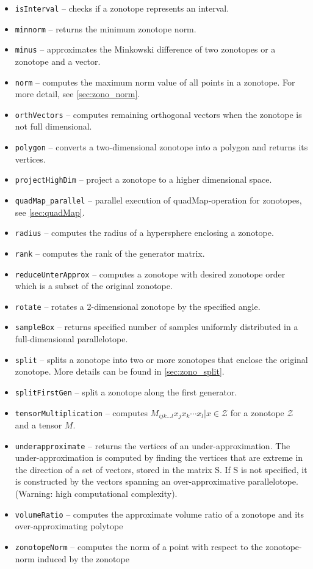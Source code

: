 \begin{itemize}
    \item \texttt{isInterval} -- checks if a zonotope represents an interval.
    \item \texttt{minnorm} -- returns the minimum zonotope norm.
    \item \texttt{minus} -- approximates the Minkowski difference of two zonotopes or a zonotope and a vector.
    \item \texttt{norm} -- computes the maximum norm value of all points in a zonotope. For more detail, see \cref{sec:zono_norm}.
    \item \texttt{orthVectors} -- computes remaining orthogonal vectors when the zonotope is not full dimensional.
    \item \texttt{polygon} -- converts a two-dimensional zonotope into a polygon and returns its vertices.
    \item \texttt{projectHighDim} -- project a zonotope to a higher dimensional space.
    \item \texttt{quadMap\_parallel} -- parallel execution of quadMap-operation for zonotopes, see \cref{sec:quadMap}.
    \item \texttt{radius} -- computes the radius of a hypersphere enclosing a zonotope.
    \item \texttt{rank} -- computes the rank of the generator matrix.
    \item \texttt{reduceUnterApprox} -- computes a zonotope with desired zonotope order which is a subset of the original zonotope.
    \item \texttt{rotate} -- rotates a 2-dimensional zonotope by the specified angle.
    \item \texttt{sampleBox} -- returns specified number of samples uniformly distributed in a full-dimensional parallelotope.
    \item \texttt{split} -- splits a zonotope into two or more zonotopes that enclose the original zonotope. More details can be found in \cref{sec:zono_split}.
    \item \texttt{splitFirstGen} -- split a zonotope along the first generator.
    \item \texttt{tensorMultiplication} -- computes $M_{ijk...l} x_j x_k \cdots x_l | x \in \mathcal{Z}$ for a zonotope $\mathcal{Z}$ and a tensor $M$.
    \item \texttt{underapproximate} -- returns the vertices of an under-approximation. The under-approximation is computed by finding the vertices that are extreme in the direction of a set of vectors, stored in the matrix S. If S is not specified, it is constructed by the vectors spanning an over-approximative parallelotope. (Warning: high computational complexity).
    \item \texttt{volumeRatio} -- computes the approximate volume ratio of a zonotope and its over-approximating polytope
    \item \texttt{zonotopeNorm} -- computes the norm of a point with respect to the zonotope-norm induced by the zonotope
\end{itemize}

